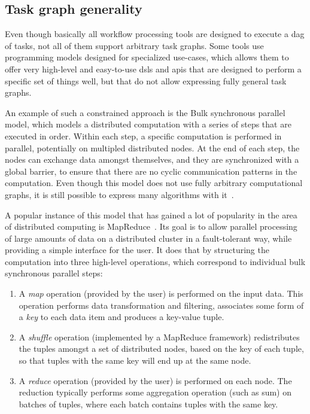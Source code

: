 \subsection*{Task graph generality}
Even though basically all workflow processing tools are designed to execute a
\gls{dag} of tasks, not all of them support arbitrary task graphs. Some tools use
programming models designed for specialized use-cases, which allows them to offer very high-level
and easy-to-use \glspl{dsl} and \glspl{api} that are designed to
perform a specific set of things well, but that do not allow expressing fully general task graphs.

An example of such a constrained approach is the Bulk synchronous
parallel~\cite{bulkparallel1} model, which models a distributed computation with a series of
steps that are executed in order. Within each step, a specific computation is performed in
parallel, potentially on multipled distributed nodes. At the end of each step, the nodes can
exchange data amongst themselves, and they are synchronized with a global barrier, to ensure that
there are no cyclic communication patterns in the computation. Even though this model does not use
fully arbitrary computational graphs, it is still possible to express many algorithms with
it~\cite{bulkparallel2}.

A popular instance of this model that has gained a lot of popularity in the area of distributed
computing is MapReduce~\cite{mapreduce}. Its goal is to allow parallel processing of
large amounts of data on a distributed cluster in a fault-tolerant way, while providing a simple
interface for the user. It does that by structuring the computation into three high-level
operations, which correspond to individual bulk synchronous parallel steps:
\begin{enumerate}
	\item A \emph{map} operation (provided by the user) is performed on the input data. This
	      operation performs data transformation and filtering, associates some form of a
	      \emph{key} to each data item and produces a key-value tuple.
	\item A \emph{shuffle} operation (implemented by a MapReduce framework) redistributes the
	      tuples amongst a set of distributed nodes, based on the key of each tuple, so that tuples with the
	      same key will end up at the same node.
	\item A \emph{reduce} operation (provided by the user) is performed on each node. The
	      reduction typically performs some aggregation operation (such as sum) on batches of tuples, where
	      each batch contains tuples with the same key.
\end{enumerate}

